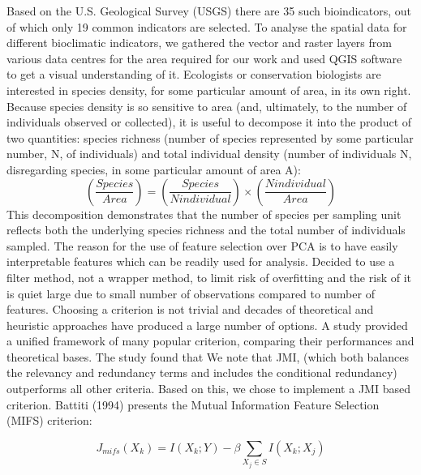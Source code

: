 \documentclass[prl,showpacs,superscriptaddress,twocolumn,longbibliography]{revtex4-1}
\begin{document}
Based on the U.S. Geological Survey (USGS) there are 35 such bioindicators, out of which only 19 common indicators are selected. To analyse the spatial data for different bioclimatic indicators, we gathered the vector and raster layers from various data centres for the area required for our work and used QGIS software to get a visual understanding of it\cite{a1,b2,c3,d4,e5,f6,g7,h8}.
Ecologists or conservation biologists are interested in species density, for some particular amount of area, in its own right. Because species density is so sensitive to area (and, ultimately, to the number of individuals observed or collected), it is useful to decompose it into the product of two quantities: species richness (number of species represented by some particular number, N, of individuals) and total individual density (number of individuals N, disregarding species, in some particular amount of area A):
\[
    \left(\frac{Species}{Area}\right) =  \left(\frac{Species}{N individual}\right) \times \left(\frac{N individual}{Area}\right)
\]
This decomposition demonstrates that the number of species per sampling unit
reflects both the underlying species richness and
the total number of individuals sampled\cite{Brose2003}.
The reason for the use of feature selection over PCA is to have easily interpretable features which can be readily used for analysis. Decided to use a filter method, not a wrapper method, to limit risk of overfitting and the risk of it is quiet large due to small number of observations compared to number of features.
Choosing a criterion is not trivial and decades of theoretical and heuristic approaches have produced a large number of options. A study provided a unified framework of many popular criterion, comparing their performances and theoretical bases. The study found that We note that JMI, (which both balances the relevancy and redundancy terms and includes the conditional redundancy) outperforms all other criteria\cite{Brown2012}. Based on this, we chose to implement a JMI based criterion.
Battiti (1994) presents the Mutual Information Feature Selection (MIFS) criterion:

\[ 
    J_{mifs}(X_k) = I(X_k;Y) - \beta \sum_{X_j\in S} I(X_k;X_j)
\]
\end{document}
